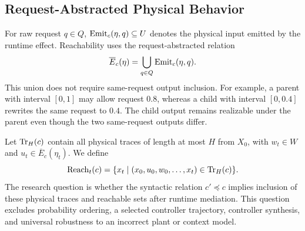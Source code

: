 \subsection{Request-Abstracted Physical Behavior}

For raw request $q\in Q$, $\operatorname{Emit}_c(\eta,q)\subseteq U$ denotes the physical input emitted by the runtime effect. Reachability uses the request-abstracted relation
\begin{equation}
    \overline{E}_c(\eta)=\bigcup_{q\in Q}\operatorname{Emit}_c(\eta,q).
    \label{eq:emission}
\end{equation}
This union does not require same-request output inclusion. For example, a parent with interval $[0,1]$ may allow request $0.8$, whereas a child with interval $[0,0.4]$ rewrites the same request to $0.4$. The child output remains realizable under the parent even though the two same-request outputs differ.

Let $\operatorname{Tr}_H(c)$ contain all physical traces of length at most $H$ from $X_0$, with $w_t\in W$ and $u_t\in\overline{E}_c(\eta_t)$. We define
\begin{equation}
 \operatorname{Reach}_t(c)=\{x_t\mid(x_0,u_0,w_0,\ldots,x_t)\in\operatorname{Tr}_H(c)\}.
 \label{eq:reach}
\end{equation}
The research question is whether the syntactic relation $c'\preceq c$ implies inclusion of these physical traces and reachable sets after runtime mediation. This question excludes probability ordering, a selected controller trajectory, controller synthesis, and universal robustness to an incorrect plant or context model.

